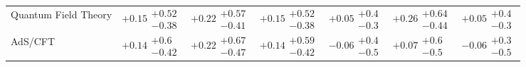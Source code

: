 \begin{table}[H]
\begin{tabular}{lllllll}
Quantum Field Theory & $+0.15\substack{+0.52 \\ -0.38}$ & $+0.22\substack{+0.57 \\ -0.41}$ & $+0.15\substack{+0.52 \\ -0.38}$ & $+0.05\substack{+0.4 \\ -0.3}$ & $+0.26\substack{+0.64 \\ -0.44}$ & $+0.05\substack{+0.4 \\ -0.3}$ \\
AdS/CFT & $+0.14\substack{+0.6 \\ -0.42}$ & $+0.22\substack{+0.67 \\ -0.47}$ & $+0.14\substack{+0.59 \\ -0.42}$ & $-0.06\substack{+0.4 \\ -0.5}$ & $+0.07\substack{+0.6 \\ -0.5}$ & $-0.06\substack{+0.3 \\ -0.5}$ \\
\bottomrule
\end{tabular}\normalsize\renewcommand{\arraystretch}{1}
\end{table}
